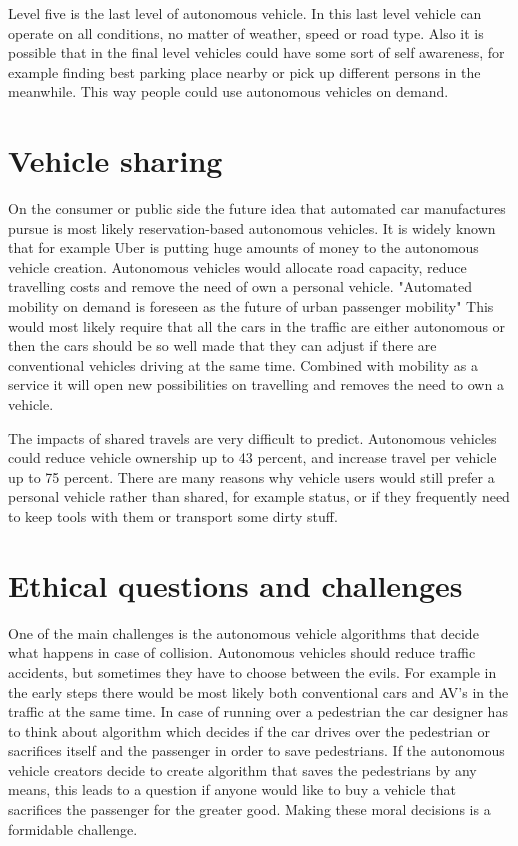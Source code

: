\documentclass[english]{tktltiki}
\begin{document}
Level five is the last level of autonomous vehicle. In this last level vehicle 
can operate on all conditions, no matter of weather, speed or road type. 
\cite{transportpolicy} Also it is possible that in the final level vehicles 
could have some sort of self awareness, for example finding best parking place 
nearby or pick up different persons in the meanwhile. This way people could use 
autonomous vehicles on demand.


\section{Vehicle sharing}
On the consumer or public side the future idea that automated car manufactures 
pursue is most likely reservation-based autonomous vehicles. It is widely known 
that for example Uber is putting huge amounts of money to the autonomous vehicle 
creation. Autonomous vehicles would allocate road capacity, reduce travelling 
costs and remove the need of own a personal vehicle. \cite{ondemand} "Automated 
mobility on demand is foreseen as the future of urban passenger mobility" 
\cite{ondemand} This would most likely require that all the cars in the traffic 
are either autonomous or then the cars should be so well made that they can 
adjust if there are conventional vehicles driving at the same time. Combined 
with mobility as a service it will open new possibilities on travelling and 
removes the need to own a vehicle. 

The impacts of shared travels are very 
difficult to predict. Autonomous vehicles could reduce vehicle ownership up to 
43 percent, and increase travel per vehicle up to 75 percent. 
\cite{transportpolicy} There are many reasons why vehicle users would still 
prefer a personal vehicle rather than shared, for example status, or if they 
frequently need to keep tools with them or transport some dirty stuff.


\section{Ethical questions and challenges}
One of the main challenges is the autonomous vehicle algorithms that decide what 
happens in case of collision. \cite{dilemma} Autonomous vehicles should reduce 
traffic accidents, but sometimes they have to choose between the evils. For 
example in the early steps there would be most likely both conventional cars and 
AV's in the traffic at the same time. In case of running over a pedestrian the 
car designer has to think about algorithm which decides if the car drives over 
the pedestrian or sacrifices itself and the passenger in order to save 
pedestrians. If the autonomous vehicle creators decide to create algorithm that 
saves the pedestrians by any means, this leads to a question if anyone would 
like to buy a vehicle that sacrifices the passenger for the greater good. Making 
these moral decisions is a formidable challenge.
\end{document}
